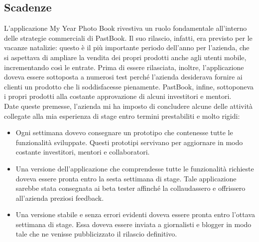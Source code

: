 		\subsection{Scadenze}
			L'applicazione My Year Photo Book rivestiva un ruolo fondamentale all'interno delle strategie commerciali di PastBook. Il suo
			rilascio, infatti, era previsto per le vacanze natalizie: questo è il più importante periodo dell'anno per l'azienda, che si
			aspettava di ampliare la vendita dei propri prodotti anche agli utenti mobile, incrementando così le entrate. Prima di essere
			rilasciata, inoltre, l'applicazione doveva essere sottoposta a numerosi test perché l'azienda desiderava fornire ai clienti
			un prodotto che li soddisfacesse pienamente. PastBook, infine, sottoponeva i propri prodotti alla costante approvazione di
			alcuni investitori e mentori.\\
			Date queste premesse, l'azienda mi ha imposto di concludere alcune delle attività collegate alla mia esperienza di stage
			entro termini prestabiliti e molto rigidi:
			\begin{itemize}
				\item Ogni settimana dovevo consegnare un prototipo che contenesse tutte le funzionalità sviluppate. Questi prototipi
				servivano per aggiornare in modo costante investitori, mentori e collaboratori.
				\item Una versione dell'applicazione che comprendesse tutte le funzionalità richieste doveva essere pronta entro
				la sesta settimana di stage. Tale applicazione sarebbe stata consegnata ai beta tester affinché la collaudassero e
				offrissero all'azienda preziosi feedback.
				\item Una versione stabile e senza errori evidenti doveva essere pronta entro l'ottava settimana di stage. Essa
				doveva essere inviata a giornalisti e blogger in modo tale che ne venisse pubblicizzato il rilascio definitivo.
			\end{itemize}
